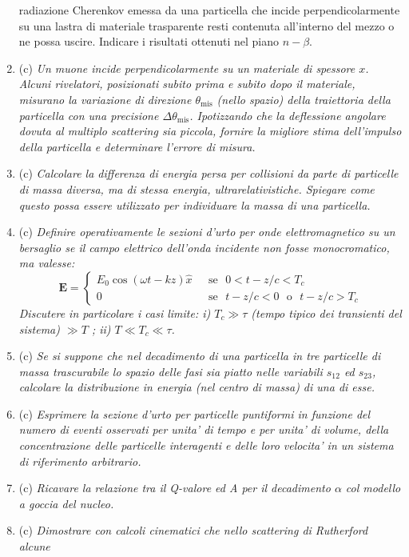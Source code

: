 \documentclass{article}
\renewcommand{\c}{(c)}
\renewcommand{\t}[1]{\textit{ #1}}
\renewcommand{\vec}[1]{\mathbf{#1}}
\begin{document}
\begin{enumerate}
{		radiazione Cherenkov emessa da una particella che incide perpendicolarmente su
		una lastra di materiale trasparente resti contenuta all’interno del mezzo o ne possa
		uscire. Indicare i risultati ottenuti nel piano $n-\beta$.}
	\item\c\t{Un muone incide perpendicolarmente su un materiale di spessore $x$. Alcuni
		rivelatori, posizionati subito prima e subito dopo il materiale, misurano la
		variazione di direzione $\theta_\mathrm{mis}$ (nello spazio) della traiettoria della particella con una
		precisione $\Delta\theta_\mathrm{mis}$. Ipotizzando che la deflessione angolare dovuta al multiplo
		scattering sia piccola, fornire la migliore stima dell'impulso della particella e
		determinare l'errore di misura.}
	\item\c\t{Calcolare la differenza di energia persa per collisioni da parte di particelle di
		massa diversa, ma di stessa energia, ultrarelativistiche. Spiegare come questo
		possa essere utilizzato per individuare la massa di una particella.}
	\item\c\t{Definire operativamente le sezioni d'urto per onde elettromagnetico su un
		bersaglio se il campo elettrico dell'onda incidente non fosse monocromatico, ma 
		valesse:\[\vec{E}=\begin{cases}
		E_0\cos(\omega t-kz)\hat{x}&\textrm{ }\mathrm{se}\textrm{ }0<t-z/c<T_c\\0&\textrm{ }\mathrm{se}\textrm{ }t-z/c<0\textrm{ }\mathrm{o}\textrm{ }t-z/c>T_c
		\end{cases}\]
		Discutere in
		particolare i casi limite: i) $T_c\gg \tau$ (tempo tipico dei transienti del sistema)
		$\gg T$ ; ii) $T\ll T_c\ll\tau$.}
	\item\c\t{Se si suppone che nel decadimento di una particella in tre particelle di massa
		trascurabile lo spazio delle fasi sia piatto nelle variabili $s_{12}$ ed $s_{23}$, calcolare la
		distribuzione in energia (nel centro di massa) di una di esse.}
	\item\c\t{Esprimere la sezione d’urto per particelle puntiformi in funzione del numero di
		eventi osservati per unita’ di tempo e per unita’ di volume, della concentrazione
		delle particelle interagenti e delle loro velocita’ in un sistema di riferimento
		arbitrario.}
	\item\c\t{Ricavare la relazione tra il Q-valore ed A per il decadimento $\alpha$ col modello a
		goccia del nucleo.}
	\item\c\t{Dimostrare con calcoli cinematici che nello scattering di Rutherford alcune
}
\end{enumerate}
\end{document}
